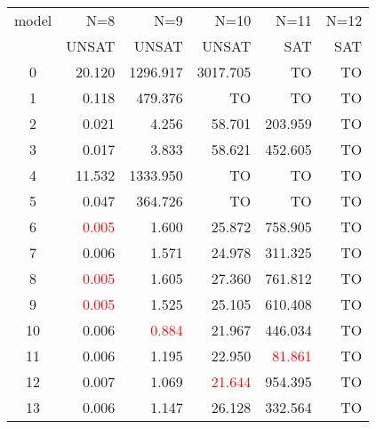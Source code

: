  \begin{tabular}[c] {|c||r|r|r|r|r|}\hline
  model & N=8    & N=9           & N=10           & N=11           & N=12 \\
        & UNSAT  & UNSAT         & UNSAT          & SAT            & SAT  \\\hline
  0     & 20.120 & 1296.917      & 3017.705       & TO             & TO   \\
  1     & 0.118  & 479.376       & TO             & TO             & TO   \\
  2     & 0.021 & 4.256      & 58.701       & 203.959             & TO   \\
  3     & 0.017  & 3.833       & 58.621             & 452.605             & TO   \\
  4     & 11.532 & 1333.950      & TO             & TO             & TO   \\
  5     & 0.047  & 364.726       & TO             & TO             & TO   \\
  6     & \textcolor{red}{0.005}  & 1.600         & 25.872         & 758.905        & TO   \\
  7     & 0.006  & 1.571         & 24.978         & 311.325        & TO   \\
  8     & \textcolor{red}{0.005}  & 1.605         & 27.360         & 761.812        & TO   \\
  9     & \textcolor{red}{0.005}  & 1.525         & 25.105         & 610.408        & TO   \\
  10    & 0.006  & \textcolor{red}{0.884} & 21.967         & 446.034        & TO   \\
  11    & 0.006  & 1.195         & 22.950         & \textcolor{red}{81.861} & TO   \\
  12    & 0.007  & 1.069         & \textcolor{red}{21.644} & 954.395        & TO   \\
  13    & 0.006  & 1.147         & 26.128         & 332.564        & TO   \\\hline
 \end{tabular}
